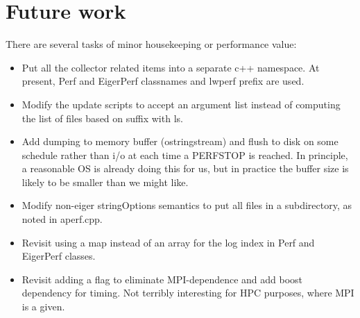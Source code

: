 \documentclass{article}
\begin{document}
\section{Future work}

There are several tasks of minor housekeeping or performance value:
\begin{itemize}

\item Put all the collector related items into a separate c++ namespace. At present, Perf and EigerPerf classnames and lwperf prefix are used.

\item Modify the update scripts to accept an argument list instead of computing
the list of files based on suffix with ls.

\item Add dumping to memory buffer (ostringstream) and flush to disk on some schedule rather than i/o at each time a PERFSTOP is reached. In principle, a reasonable OS is already doing this for us, but in practice the buffer size is likely to be smaller than we might like.

\item Modify non-eiger stringOptions semantics to put all files in a subdirectory, as noted in aperf.cpp.

\item Revisit using a map instead of an array for the log index in Perf and EigerPerf classes.

\item Revisit adding a flag to eliminate MPI-dependence and add boost dependency for timing. Not terribly interesting for HPC purposes, where MPI is a given.
\end{itemize}
\end{document}
